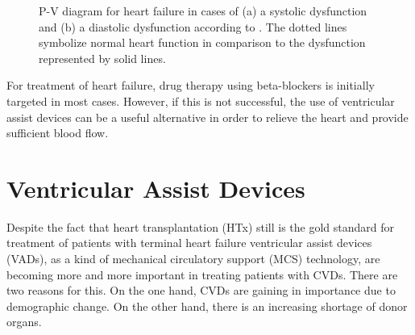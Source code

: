 \begin{figure}[h]
  \centering
  \caption[P-V diagram for heart failure]{P-V diagram for heart failure in cases of (a) a systolic dysfunction and (b) a diastolic dysfunction according to \cite{HKS_pv}. The dotted lines symbolize normal heart function in comparison to the dysfunction represented by solid lines.}
  \label{fig:hf_dys}
\end{figure}

For treatment of heart failure, drug therapy using beta-blockers is initially targeted in most cases. However, if this is not successful, the use of ventricular assist devices can be a useful alternative in order to relieve the heart and provide sufficient blood flow. \cite{HKS4}

\section{Ventricular Assist Devices}
Despite the fact that heart transplantation (HTx) still is the gold standard for treatment of patients with terminal heart failure \cite{VAD2} ventricular assist devices (VADs), as a kind of mechanical circulatory support (MCS) technology, are becoming more and more important in treating patients with CVDs. There are two reasons for this. On the one hand, CVDs are gaining in importance due to demographic change. On the other hand, there is an increasing shortage of donor organs. \cite{VAD7}

